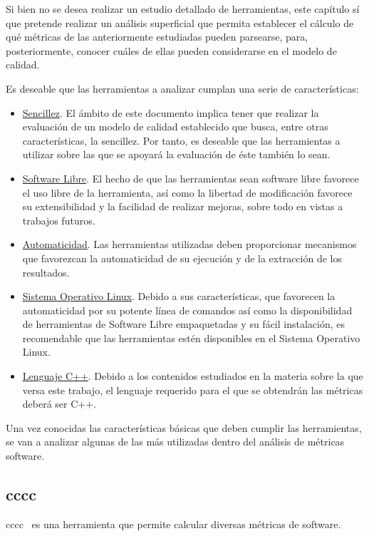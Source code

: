 \documentclass[11pt]{article}
\begin{document}
Si bien no se desea realizar un estudio detallado de herramientas, este capítulo sí que pretende realizar un análisis superficial que permita establecer el cálculo de qué métricas de las anteriormente estudiadas pueden parsearse, para, posteriormente, conocer cuáles de ellas pueden considerarse en el modelo de calidad.

Es deseable que las herramientas a analizar cumplan una serie de características:

\begin{itemize}
\item{\underline{Sencillez}}. El ámbito de este documento implica tener que realizar la evaluación de un modelo de calidad establecido que busca, entre otras características, la sencillez. Por tanto, es deseable que las herramientas a utilizar sobre las que se apoyará la evaluación de éste también lo sean.
\item{\underline{Software Libre}}. El hecho de que las herramientas sean software libre favorece el uso libre de la herramienta, así como la libertad de modificación favorece su extensibilidad y la facilidad de realizar mejoras, sobre todo en vistas a trabajos futuros.
\item{\underline{Automaticidad}}. Las herramientas utilizadas deben proporcionar mecanismos que favorezcan la automaticidad de su ejecución y de la extracción de los resultados.
\item{\underline{Sistema Operativo Linux}}. Debido a sus características, que favorecen la automaticidad por su potente línea de comandos así como la disponibilidad de herramientas de Software Libre empaquetadas y su fácil instalación, es recomendable que las herramientas estén disponibles en el Sistema Operativo Linux.
\item{\underline{Lenguaje C++}}. Debido a los contenidos estudiados en la materia sobre la que versa este trabajo, el lenguaje requerido para el que se obtendrán las métricas deberá ser C++.
\end{itemize}

Una vez conocidas las características básicas que deben cumplir las herramientas, se van a analizar algunas de las más utilizadas dentro del análisis de métricas software.

\subsection{cccc}

cccc~\cite{metrictools:cccc} es una herramienta que permite calcular diversas métricas de software. 
\end{document}
